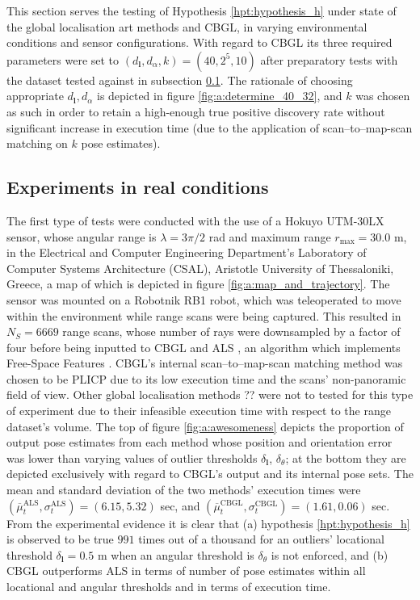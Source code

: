 This section serves the testing of Hypothesis \ref{hpt:hypothesis_h} under
state of the global localisation art methods and CBGL, in varying environmental
conditions and sensor configurations. With regard to CBGL its three required
parameters were set to $(d_{\bm{l}},d_{\alpha},k) = (40, 2^5, 10)$ after
preparatory tests with the dataset tested against in subsection
\ref{subsec:exp_in_re_co}. The rationale of choosing appropriate
$d_{\bm{l}},d_{\alpha}$ is depicted in figure \ref{fig:a:determine_40_32}, and
$k$ was chosen as such in order to retain a high-enough true positive discovery
rate without significant increase in execution time (due to the application of
scan--to--map-scan matching on $k$ pose estimates).


\subsection{Experiments in real conditions}
\label{subsec:exp_in_re_co}

The first type of tests were conducted with the use of a Hokuyo UTM-30LX
sensor, whose angular range is $\lambda = 3\pi/2$ rad and maximum range
$r_{\max} = 30.0$ m, in the  Electrical and Computer Engineering Department's
Laboratory of Computer Systems Architecture (CSAL), Aristotle University of
Thessaloniki, Greece, a map of which is depicted in figure
\ref{fig:a:map_and_trajectory}. The sensor was mounted on a Robotnik RB1 robot,
which was teleoperated to move within the environment while range scans were
being captured. This resulted in $N_{S}=6669$ range scans, whose number of rays
were downsampled by a factor of four before being inputted to CBGL and ALS
\cite{als_jp}, an algorithm which implements Free-Space Features
\cite{als_eth}. CBGL's internal scan--to--map-scan matching method was chosen
to be PLICP \cite{Censi2008c} due to its low execution time and the scans'
non-panoramic field of view.  Other global localisation methods ?? were not to
tested for this type of experiment due to their infeasible execution time with
respect to the range dataset's volume. The top of figure \ref{fig:a:awesomeness}
depicts the proportion of output pose estimates from each method whose position
and orientation error was lower than varying values of outlier thresholds
$\delta_{\bm{l}}$, $\delta_{\theta}$; at the bottom they are depicted
exclusively with regard to CBGL's output and its internal pose sets. The mean
and standard deviation of the two methods' execution times were
$(\overline{\mu}_t^{\text{ALS}}, \sigma_t^{\text{ALS}}) = (6.15, 5.32)$ sec,
and $(\overline{\mu}_t^{\text{CBGL}}, \sigma_t^{\text{CBGL}}) = (1.61, 0.06)$
sec. From the experimental evidence it is clear that (a) hypothesis
\ref{hpt:hypothesis_h} is observed to be true $991$ times out of a thousand for
an outliers' locational threshold $\delta_{\bm{l}} = 0.5$ m when an angular
threshold is $\delta_{\theta}$ is not enforced, and (b) CBGL outperforms ALS in
terms of number of pose estimates within all locational and angular thresholds
and in terms of execution time.


